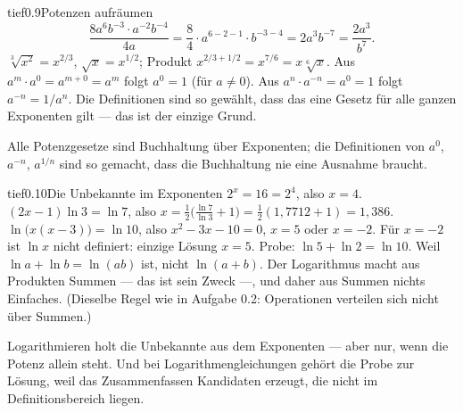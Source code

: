 \begin{loesungkarte}{tief}{0.9}{Potenzen aufräumen}
\[ \frac{8a^{6}b^{-3}\cdot a^{-2}b^{-4}}{4a} = \frac{8}{4}\cdot a^{6 - 2 - 1}\cdot b^{-3 - 4} = 2a^{3}b^{-7} = \frac{2a^{3}}{b^{7}} . \]
$\sqrt[3]{x^{2}} = x^{2/3}$, $\sqrt x = x^{1/2}$; Produkt $x^{2/3 + 1/2} = x^{7/6} = x\sqrt[6]x$.
Aus $a^{m}\cdot a^{0} = a^{m + 0} = a^{m}$ folgt $a^{0} = 1$ (für $a\neq0$). Aus $a^{n}\cdot a^{-n} = a^{0} = 1$ folgt $a^{-n} = 1/a^{n}$. Die Definitionen sind so gewählt, dass das eine Gesetz für alle ganzen Exponenten gilt --- das ist der einzige Grund.
\begin{mitnehmen}\kastentext
Alle Potenzgesetze sind Buchhaltung über Exponenten; die Definitionen von $a^{0}$, $a^{-n}$, $a^{1/n}$ sind so gemacht, dass die Buchhaltung nie eine Ausnahme braucht.
\end{mitnehmen}
\end{loesungkarte}

\begin{loesungkarte}{tief}{0.10}{Die Unbekannte im Exponenten}
$2^{x} = 16 = 2^{4}$, also $x = 4$.
$(2x - 1)\ln3 = \ln7$, also $x = \frac12\bigl(\frac{\ln7}{\ln3} + 1\bigr) = \frac12(1{,}7712 + 1) = 1{,}386$.
$\ln\bigl(x(x - 3)\bigr) = \ln10$, also $x^{2} - 3x - 10 = 0$, $x = 5$ oder $x = -2$. Für $x = -2$ ist $\ln x$ nicht definiert: einzige Lösung $x = 5$. Probe: $\ln5 + \ln2 = \ln10$. \checkmark
{}
Weil $\ln a + \ln b = \ln(ab)$ ist, nicht $\ln(a + b)$. Der Logarithmus macht aus Produkten Summen --- das ist sein Zweck ---, und daher aus Summen nichts Einfaches. (Dieselbe Regel wie in Aufgabe 0.2: Operationen verteilen sich nicht über Summen.)
\begin{mitnehmen}\kastentext
Logarithmieren holt die Unbekannte aus dem Exponenten --- aber nur, wenn die Potenz allein steht. Und bei Logarithmengleichungen gehört die Probe zur Lösung, weil das Zusammenfassen Kandidaten erzeugt, die nicht im Definitionsbereich liegen.
\end{mitnehmen}
\end{loesungkarte}

